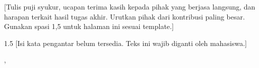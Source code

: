 
[Tulis puji syukur, ucapan terima kasih kepada pihak yang berjasa langsung,
dan harapan terkait hasil tugas akhir. Urutkan pihak dari kontribusi paling
besar. Gunakan spasi 1,5 untuk halaman ini sesuai template.]

\begin{spacing}{1.5}
  [Isi kata pengantar belum tersedia. Teks ini wajib diganti oleh mahasiswa.]
\end{spacing}

\vspace{13.8pt}
\noindent\hfill
\begin{minipage}{0.54\textwidth}
  \raggedright
  \NamaKota, \TanggalPernyataan

  \vspace{1.1cm}

  \NamaMahasiswa
\end{minipage}
